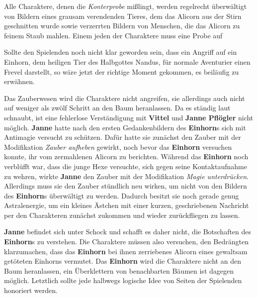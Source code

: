Alle Charaktere, denen die \textit{Konterprobe} mißlingt, werden  regelrecht überwältigt von Bildern eines grausam verendenden Tieres, dem das Alicorn aus der Stirn geschnitten wurde sowie verzerrten Bildern von Menschen, die das Alicorn zu feinem Staub mahlen. Einem jeden der Charaktere muss eine Probe auf 



Sollte den Spielenden noch nicht klar geworden sein, dass ein Angriff auf ein Einhorn, dem heiligen Tier des Halbgottes Nandus, für normale Aventurier einen Frevel darstellt, so wäre jetzt der richtige Moment gekommen, es beiläufig zu erwähnen.


Das Zauberwesen wird die Charaktere nicht angreifen, sie allerdings auch nicht auf weniger als zwölf Schritt an den Baum heranlassen.
Da es ständig laut schnaubt, ist eine fehlerlose Verständigung mit \textbf{Vittel} und \textbf{Janne Pflögler} nicht möglich.
\textbf{Janne} hatte nach den ersten Gedankenbildern des \textbf{Einhorn}s sich mit Antimagie versucht zu schützen.
Dafür hatte sie zunächst den Zauber  mit der Modifikation \textit{Zauber aufheben} gewirkt, noch bevor das \textbf{Einhorn} versuchen konnte, ihr vom zermahlenen Alicorn zu berichten.
Während das \textbf{Einhorn} noch verblüfft war, dass die junge Hexe versuchte, sich gegen seine Kontaktaufnahme zu wehren, wirkte \textbf{Janne} den Zauber  mit der Modifikation \textit{Magie unterdrücken}.
Allerdings muss sie den Zauber stündlich neu wirken, um nicht von den Bildern des \textbf{Einhorn}s überwältigt zu werden.
Dadurch besitzt sie noch gerade genug Astralenergie, um ein kleines Ästchen mit einer kurzen, geschriebenen Nachricht per  den Charakteren zunächst zukommen und wieder zurückfliegen zu lassen. 


\textbf{Janne} befindet sich unter Schock und schafft es daher nicht, die Botschaften des \textbf{Einhorn}s zu verstehen.
Die Charaktere müssen also versuchen, den Bedrängten klarzumachen, dass das \textbf{Einhorn} bei ihnen zerriebenes Alicorn eines gewaltsam getöteten Einhorns vermutet.
Das \textbf{Einhorn} wird die Charaktere nicht an den Baum heranlassen, ein Überklettern von benachbarten Bäumen ist dagegen möglich.
Letztlich sollte jede halbwegs logische Idee von Seiten der Spielenden honoriert werden.


